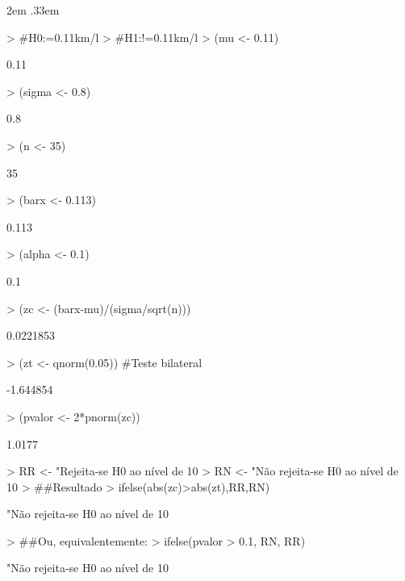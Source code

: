 \documentclass{article}
\newenvironment{ManualExercise}
  {\begin{list}{}{\leftmargin \QuestionIndent
    \partopsep0pt \parsep\parskip \topsep\QuestionBefore
    \itemsep\QuestionBefore \labelwidth2em
    \labelsep.33em
    \usecounter{Question}}}
  {\end{list}}
\begin{document}
\begin{Exercise}
\begin{ManualExercise}
\begin{Schunk}
\begin{Sinput}
> #H0:\mu=0.11km/l
> #H1:\mu!=0.11km/l
> (mu <- 0.11)
\end{Sinput}
\begin{Soutput}
[1] 0.11
\end{Soutput}
\begin{Sinput}
> (sigma <- 0.8)
\end{Sinput}
\begin{Soutput}
[1] 0.8
\end{Soutput}
\begin{Sinput}
> (n <- 35)
\end{Sinput}
\begin{Soutput}
[1] 35
\end{Soutput}
\begin{Sinput}
> (barx <- 0.113)
\end{Sinput}
\begin{Soutput}
[1] 0.113
\end{Soutput}
\begin{Sinput}
> (alpha <- 0.1)
\end{Sinput}
\begin{Soutput}
[1] 0.1
\end{Soutput}
\begin{Sinput}
> (zc <- (barx-mu)/(sigma/sqrt(n)))
\end{Sinput}
\begin{Soutput}
[1] 0.0221853
\end{Soutput}
\begin{Sinput}
> (zt <- qnorm(0.05)) #Teste bilateral
\end{Sinput}
\begin{Soutput}
[1] -1.644854
\end{Soutput}
\begin{Sinput}
> (pvalor <- 2*pnorm(zc))
\end{Sinput}
\begin{Soutput}
[1] 1.0177
\end{Soutput}
\begin{Sinput}
> RR <- "Rejeita-se H0 ao nível de 10%
> RN <- "Não rejeita-se H0 ao nível de 10%
> ##Resultado
> ifelse(abs(zc)>abs(zt),RR,RN)
\end{Sinput}
\begin{Soutput}
[1] "Não rejeita-se H0 ao nível de 10%
\end{Soutput}
\begin{Sinput}
> ##Ou, equivalentemente:
> ifelse(pvalor > 0.1, RN, RR)
\end{Sinput}
\begin{Soutput}
[1] "Não rejeita-se H0 ao nível de 10%
\end{Soutput}
\end{Schunk}


\end{ManualExercise}
\end{Exercise}
\end{document}
